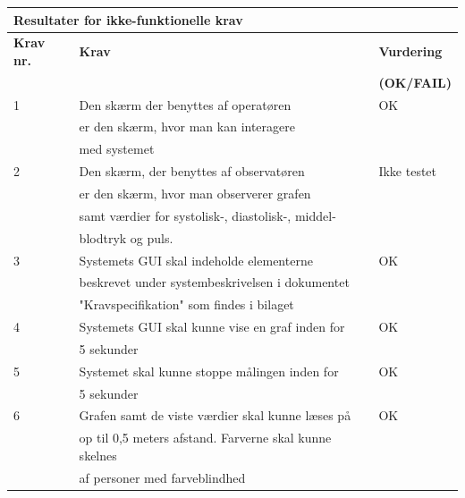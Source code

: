 \begin{table}[h!]
	\centering
	\begin{tabular}{lll}
		\multicolumn{3}{l}{\cellcolor[HTML]{187ABD}\textbf{Resultater for ikke-funktionelle krav}} \\ \hline
		\multicolumn{1}{l|}{\textbf{Krav nr.}} & \multicolumn{1}{l|}{\textbf{Krav}} & \textbf{Vurdering} \\
		\multicolumn{1}{l|}{} & \multicolumn{1}{l|}{} & \textbf{(OK/FAIL)} \\ \hline
		\multicolumn{1}{l|}{1} & \multicolumn{1}{l|}{Den skærm der benyttes af operatøren} & OK \\
		\multicolumn{1}{l|}{} & \multicolumn{1}{l|}{er den skærm, hvor man kan interagere} &  \\
		\multicolumn{1}{l|}{} & \multicolumn{1}{l|}{med systemet} &  \\ \hline
		\multicolumn{1}{l|}{2} & \multicolumn{1}{l|}{Den skærm, der benyttes af observatøren} & Ikke testet \\
		\multicolumn{1}{l|}{} & \multicolumn{1}{l|}{er den skærm, hvor man observerer grafen} &  \\
		\multicolumn{1}{l|}{} & \multicolumn{1}{l|}{samt værdier for systolisk-, diastolisk-, middel-} &  \\
		\multicolumn{1}{l|}{} & \multicolumn{1}{l|}{blodtryk og puls.} &  \\ \hline
		\multicolumn{1}{l|}{3} & \multicolumn{1}{l|}{Systemets GUI skal indeholde elementerne} & OK \\
		\multicolumn{1}{l|}{} & \multicolumn{1}{l|}{beskrevet under systembeskrivelsen i dokumentet} &  \\
		\multicolumn{1}{l|}{} & \multicolumn{1}{l|}{"Kravspecifikation" som findes i bilaget} &  \\ \hline
		\multicolumn{1}{l|}{4} & \multicolumn{1}{l|}{Systemets GUI skal kunne vise en graf inden for} & OK \\
		\multicolumn{1}{l|}{} & \multicolumn{1}{l|}{5 sekunder} &  \\ \hline
		\multicolumn{1}{l|}{5} & \multicolumn{1}{l|}{Systemet skal kunne stoppe målingen inden for} & OK \\
		\multicolumn{1}{l|}{} & \multicolumn{1}{l|}{5 sekunder} &  \\ \hline
		\multicolumn{1}{l|}{6} & \multicolumn{1}{l|}{Grafen samt de viste værdier skal kunne læses på} & OK \\
		\multicolumn{1}{l|}{} & \multicolumn{1}{l|}{op til 0,5 meters afstand. Farverne skal kunne skelnes} &  \\
		\multicolumn{1}{l|}{} & \multicolumn{1}{l|}{af personer med farveblindhed} & 
	\end{tabular}
\end{table}

